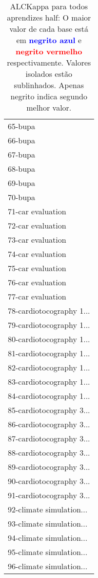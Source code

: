 \begin{table}[h]
\caption{ALCKappa para todos aprendizes half: O maior valor de cada base está em \textcolor{blue}{\textbf{negrito azul}} e \textcolor{red}{\textbf{negrito vermelho}} respectivamente. Valores isolados estão sublinhados. Apenas negrito indica segundo melhor valor.}
\begin{center}\begin{tabular}{l}
 & \\ \hline 65-bupa &  \\
66-bupa &  \\
67-bupa &  \\
68-bupa &  \\
69-bupa &  \\
70-bupa &  \\
71-car evaluation &  \\ \hline
72-car evaluation &  \\
73-car evaluation &  \\
74-car evaluation &  \\
75-car evaluation &  \\
76-car evaluation &  \\
77-car evaluation &  \\
78-cardiotocography 1... &  \\ \hline
79-cardiotocography 1... &  \\
80-cardiotocography 1... &  \\
81-cardiotocography 1... &  \\
82-cardiotocography 1... &  \\
83-cardiotocography 1... &  \\
84-cardiotocography 1... &  \\
85-cardiotocography 3... &  \\ \hline
86-cardiotocography 3... &  \\
87-cardiotocography 3... &  \\
88-cardiotocography 3... &  \\
89-cardiotocography 3... &  \\
90-cardiotocography 3... &  \\
91-cardiotocography 3... &  \\
92-climate simulation... &  \\ \hline
93-climate simulation... &  \\
94-climate simulation... &  \\
95-climate simulation... &  \\
96-climate simulation... &  \\\end{tabular}\label{stratsALCKappa2AllReduxHalfb}
\end{center}
\end{table}
